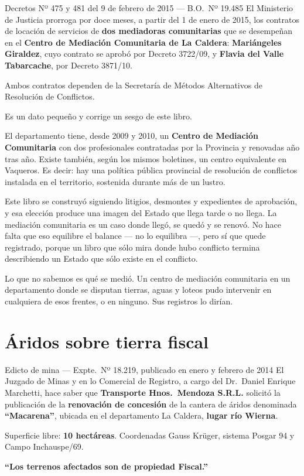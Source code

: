 \begin{ficha}{Decretos Nº 475 y 481 del 9 de febrero de 2015 --- B.O.\ Nº 19.485}
El Ministerio de Justicia prorroga por doce meses, a partir del 1 de enero de 2015, los contratos de locación de servicios de \textbf{dos mediadoras comunitarias} que se desempeñan en el \textbf{Centro de Mediación Comunitaria de La Caldera}: \textbf{Mariángeles Giraldez}, cuyo contrato se aprobó por Decreto 3722/09, y \textbf{Flavia del Valle Tabarcache}, por Decreto 3871/10.

Ambos contratos dependen de la Secretaría de Métodos Alternativos de Resolución de Conflictos.
\end{ficha}

\begin{cautela}
Es un dato pequeño y corrige un sesgo de este libro.

El departamento tiene, desde 2009 y 2010, un \textbf{Centro de Mediación Comunitaria} con dos profesionales contratadas por la Provincia y renovadas año tras año. Existe también, según los mismos boletines, un centro equivalente en Vaqueros. Es decir: hay una política pública provincial de resolución de conflictos instalada en el territorio, sostenida durante más de un lustro.

Este libro se construyó siguiendo litigios, desmontes y expedientes de aprobación, y esa elección produce una imagen del Estado que llega tarde o no llega. La mediación comunitaria es un caso donde llegó, se quedó y se renovó. No hace falta que eso equilibre el balance --- no lo equilibra ---, pero sí que quede registrado, porque un libro que sólo mira donde hubo conflicto termina describiendo un Estado que sólo existe en el conflicto.

Lo que no sabemos es qué se medió. Un centro de mediación comunitaria en un departamento donde se disputan tierras, aguas y loteos pudo intervenir en cualquiera de esos frentes, o en ninguno. Sus registros lo dirían.
\end{cautela}

\section{Áridos sobre tierra fiscal}

\begin{ficha}{Edicto de mina --- Expte.\ Nº 18.219, publicado en enero y febrero de 2014}
El Juzgado de Minas y en lo Comercial de Registro, a cargo del Dr.\ Daniel Enrique Marchetti, hace saber que \textbf{Transporte Hnos.\ Mendoza S.R.L.} solicitó la publicación de la \textbf{renovación de concesión} de la cantera de áridos denominada \textbf{``Macarena''}, ubicada en el departamento La Caldera, \textbf{lugar río Wierna}.

Superficie libre: \textbf{10 hectáreas}. Coordenadas Gauss Krüger, sistema Posgar 94 y Campo Inchauspe/69.

\textbf{``Los terrenos afectados son de propiedad Fiscal.''}
\end{ficha}

